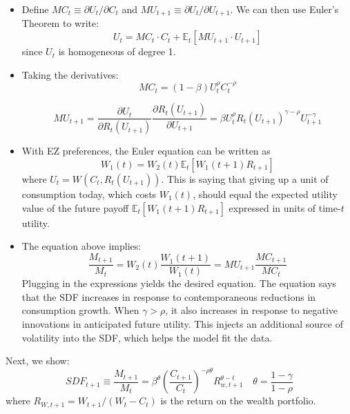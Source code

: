 \documentclass[
]{book}
\begin{document}
\begin{itemize}
\item
  Define \(MC_{t}\equiv\partial U_{t}/\partial C_{t}\) and \(MU_{t+1}\equiv\partial U_{t}/\partial U_{t+1}\). We can then use Euler's Theorem to write:
  \[
  U_{t}=MC_{t}\cdot C_{t}+\mathbb{E}_{t}\left[MU_{t+1}\cdot U_{t+1}\right]
  \]
  since \(U_t\) is homogeneous of degree 1.
\item
  Taking the derivatives:
  \[
  MC_{t}=\left(1-\beta\right)U_{t}^{\rho}C_{t}^{-\rho}
  \]

  \[
  MU_{t+1} =\frac{\partial U_{t}}{\partial R_{t}\left(U_{t+1}\right)}\frac{\partial R_{t}\left(U_{t+1}\right)}{\partial U_{t+1}}= \beta U_{t}^{\rho}R_{t}\left(U_{t+1}\right)^{\gamma-\rho}U_{t+1}^{-\gamma}
  \]
\item
  With EZ preferences, the Euler equation can be written as
  \[
  W_{1}\left(t\right)=W_{2}\left(t\right)\mathbb{E}_{t}\left[W_{1}\left(t+1\right)R_{t+1}\right]
  \]
  where \(U_{t}=W\left(C_{t},R_{t}\left(U_{t+1}\right)\right)\). This is saying that giving up a unit of consumption today, which costs \(W_1(t)\), should equal the expected utility value of the future payoff \(\mathbb{E}_{t}\left[W_{1}\left(t+1\right)R_{t+1}\right]\) expressed in units of time-\(t\) utility.
\item
  The equation above implies:
  \[
  \frac{M_{t+1}}{M_{t}}=W_{2}\left(t\right)\frac{W_{1}\left(t+1\right)}{W_{1}\left(t\right)}=MU_{t+1}\frac{MC_{t+1}}{MC_{t}}
  \]
  Plugging in the expressions yields the desired equation. The equation says that the SDF increases in response to contemporaneous reductions in consumption growth. When \(\gamma>\rho\), it also increases in response to negative innovations in anticipated future utility. This injects an additional source of volatility into the SDF, which helps the model fit the data.
\end{itemize}

Next, we show:
\[
SDF_{t+1}\equiv\frac{M_{t+1}}{M_{t}}=\beta^{\theta}\left(\frac{C_{t+1}}{C_{t}}\right)^{-\rho\theta}R_{w,t+1}^{\theta-t}\quad\theta=\frac{1-\gamma}{1-\rho}
\]
where \(R_{W,t+1}=W_{t+1}/\left(W_{t}-C_{t}\right)\) is the return on the wealth portfolio.
\end{document}
